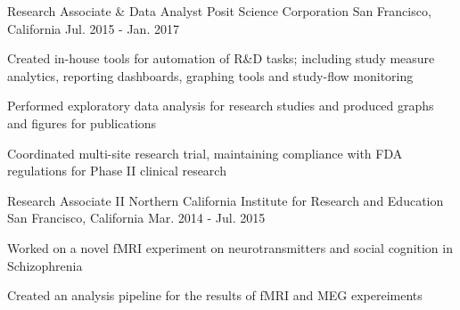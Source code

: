 \documentclass[../omelveny-cv]{subfiles}
\begin{document}
\begin{cventries}
    \cventry
    {Research Associate \& Data Analyst}
    {Posit Science Corporation}
    {San Francisco, California}
    {Jul. 2015 - Jan. 2017}
    {
        \begin{cvitems}
            \item {Created in-house tools for automation of R\&D tasks; including study measure analytics, reporting dashboards, graphing tools and study-flow monitoring}
            \item {Performed exploratory data analysis for research studies and produced graphs and figures for publications}
            \item {Coordinated multi-site research trial, maintaining compliance with FDA regulations for Phase II clinical research}
        \end{cvitems}
    }

    \cventry
    {Research Associate II}
    {Northern California Institute for Research and Education}
    {San Francisco, California}
    {Mar. 2014 - Jul. 2015}
    {
        \begin{cvitems}
            \item {Worked on a novel fMRI experiment on neurotransmitters and social cognition in Schizophrenia}
            \item {Created an analysis pipeline for the results of fMRI and MEG expereiments}
        \end{cvitems}
    }


\end{cventries}
\end{document}
